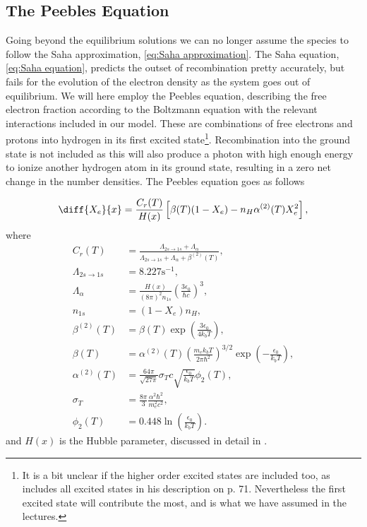 \documentclass[10pt,a4paper]{article}
\begin{document}
\subsection{The Peebles Equation}
\label{subsec:Theory/Peebles equation}
Going beyond the equilibrium solutions we can no longer assume the species to follow the Saha approximation, \cref{eq:Saha approximation}. The Saha equation, \cref{eq:Saha equation}, predicts the outset of recombination pretty accurately, but fails for the evolution of the electron density as the system goes out of equilibrium. We will here employ the Peebles equation, describing the free electron fraction according to the Boltzmann equation with the relevant interactions included in our model. These are combinations of free electrons and protons into hydrogen in its first excited state\footnote{It is a bit unclear if the higher order excited states are included too, as \cite{Dodelson} includes all excited states in his description on p. 71. Nevertheless the first excited state will contribute the most, and is what we have assumed in the lectures.}. Recombination into the ground state is not included as this will also produce a photon with high enough energy to ionize another hydrogen atom in its ground state, resulting in a zero net change in the number densities. The Peebles equation goes as follows 


\begin{equation}
\diff{X_e}{x} = \frac{C_r(T)}{H(x)} \left[\beta(T)(1-X_e) - n_H
\alpha^{(2)}(T)X_e^2\right],
\label{eq:Peebles equation}
\end{equation}
where
\begingroup
\allowdisplaybreaks
\begin{align}
C_r(T) &= \frac{\Lambda_{2s\rightarrow1s} +
\Lambda_{\alpha}}{\Lambda_{2s\rightarrow1s} + \Lambda_{\alpha} +
\beta^{(2)}(T)},
\\
\Lambda_{2s\rightarrow1s} &= 8.227 \textrm{s}^{-1},
\\
\Lambda_{\alpha} &= \frac{H(x)}{(8\pi)^2 n_{1s}} \left(\frac{3\epsilon_0}{\hbar c}\right)^3,
\\
n_{1s} &= (1-X_e)n_H,
\\
\beta^{(2)}(T) &= \beta(T) \exp(\frac{3\epsilon_0}{4k_b T}), \label{eq:beta 2}
\\
\beta(T) &= \alpha^{(2)}(T) \left(\frac{m_e k_b T}{2\pi\hbar^2}\right)^{3/2} \exp(-\frac{\epsilon_0}{k_b T}), \label{eq:beta}
\\
\alpha^{(2)}(T) &= \frac{64\pi}{\sqrt{27\pi}} \sigma_T c \sqrt{\frac{\epsilon_0}{k_b T}}\phi_2(T),
\\
\sigma_T &= \frac{8\pi}{3}\frac{\alpha^2\hbar^2}{m_e^2c^2}, \label{eq:sigma T}
\\
\phi_2(T) &= 0.448\ln(\frac{\epsilon_0}{k_b T}). \label{eq:phi Peebles}
\end{align}
\endgroup
and $H(x)$ is the Hubble parameter, discussed in detail in \cite{milestone1}.
\end{document}
